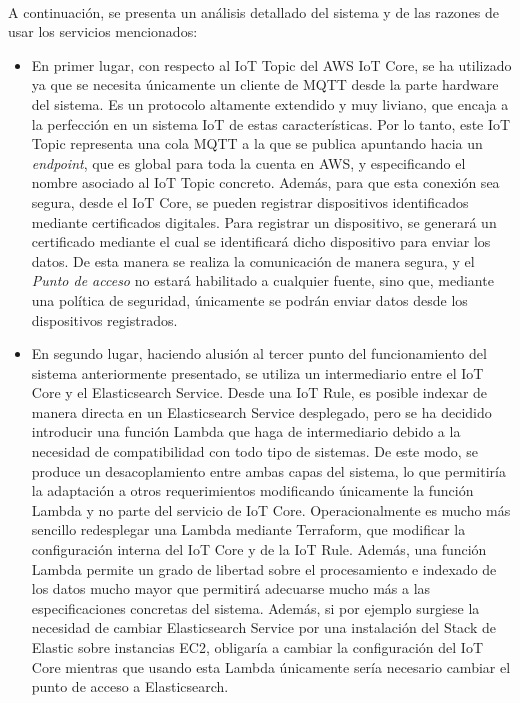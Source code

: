 \documentclass[../../memoria.tex]{subfiles}
\begin{document}
\paragraph{}
A continuación, se presenta un análisis detallado del sistema y de las razones de usar los servicios mencionados:

\begin{itemize}
    \item En primer lugar, con respecto al IoT Topic del AWS IoT Core, se ha utilizado ya que se necesita únicamente un cliente de MQTT desde la parte hardware del sistema. Es un protocolo altamente extendido y muy liviano, que encaja a la perfección en un sistema IoT de estas características. Por lo tanto, este IoT Topic representa una cola MQTT a la que se publica apuntando hacia un \textit{endpoint}, que es global para toda la cuenta en AWS, y especificando el nombre asociado al IoT Topic concreto. Además, para que esta conexión sea segura, desde el IoT Core, se pueden registrar dispositivos identificados mediante certificados digitales. Para registrar un dispositivo, se generará un certificado mediante el cual se identificará dicho dispositivo para enviar los datos. De esta manera se realiza la comunicación de manera segura, y el \textit{Punto de acceso} no estará habilitado a cualquier fuente, sino que, mediante una política de seguridad, únicamente se podrán enviar datos desde los dispositivos registrados.

    \item En segundo lugar, haciendo alusión al tercer punto del funcionamiento del sistema anteriormente presentado, se utiliza un intermediario entre el IoT Core y el Elasticsearch Service. Desde una IoT Rule, es posible indexar de manera directa en un Elasticsearch Service desplegado, pero se ha decidido introducir una función Lambda que haga de intermediario debido a la necesidad de compatibilidad con todo tipo de sistemas. De este modo, se produce un desacoplamiento entre ambas capas del sistema, lo que permitiría la adaptación a otros requerimientos modificando únicamente la función Lambda y no parte del servicio de IoT Core. Operacionalmente es mucho más sencillo redesplegar una Lambda mediante Terraform, que modificar la configuración interna del IoT Core y de la IoT Rule. Además, una función Lambda permite un grado de libertad sobre el procesamiento e indexado de los datos mucho mayor que permitirá adecuarse mucho más a las especificaciones concretas del sistema. Además, si por ejemplo surgiese la necesidad de cambiar Elasticsearch Service por una instalación del Stack de Elastic sobre instancias EC2, obligaría a cambiar la configuración del IoT Core mientras que usando esta Lambda únicamente sería necesario cambiar el punto de acceso a Elasticsearch.


\end{itemize}
\end{document}
